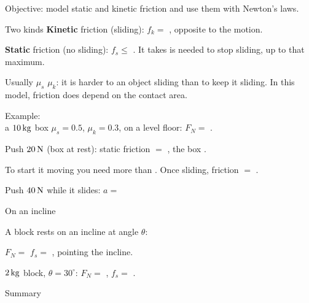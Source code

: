 \begin{center}\textsf{\small\color{apgrey}Objective: model static and kinetic friction and use them with Newton's laws.}\end{center}
\begin{nrow}{Two kinds}
\textbf{Kinetic} friction (sliding): $f_k=$ , opposite to the  motion.\par
\textbf{Static} friction (no sliding): $f_s\le$ . It takes  is needed to stop sliding, up to that maximum.\par
Usually $\mu_s$ \fillin{$\ge$} $\mu_k$: it is harder to  an object sliding than to keep it sliding. In this model, friction does  depend on the contact area.
\end{nrow}
\begin{nrow}{Example:\\ a $10\,\mathrm{kg}$ box}
$\mu_s=0.5$, $\mu_k=0.3$, on a level floor: $F_N=$ \fillin{$100\N$}.\par
Push $20\N$ (box at rest): static friction $=$ \fillin{$20\N$}, the box .\par
To start it moving you need more than \fillin{$50\N$}. Once sliding, friction $=$ \fillin{$30\N$}.\par
Push $40\,\mathrm{N}$ while it slides: $a=$ 
\end{nrow}
\begin{nrow}{On an incline}
\begin{minipage}[t]{0.6\linewidth}
A block rests on an incline at angle $\theta$:\par
$F_N=$  \qquad $f_s=$ , pointing  the incline.\par
$2\,\mathrm{kg}$ block, $\theta=30^\circ$: $F_N=$ \fillin{$17.3\N$}, $f_s=$ \fillin{$10\N$}.
\end{minipage}\hfill
\begin{minipage}[t]{0.34\linewidth}\vspace{0pt}
\end{minipage}
\end{nrow}
\begin{nrow}{Summary}
\else\vspace{2.2cm}\fi
\end{nrow}

